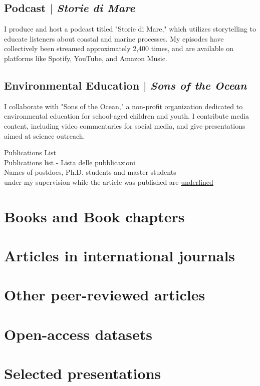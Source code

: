 \documentclass[11pt]{article}
\begin{document}
\subsection{Podcast $|$ {\normalfont\textit{Storie di Mare}}}
{\footnotesize I produce and host a podcast titled "Storie di Mare," which utilizes storytelling to educate listeners about coastal and marine processes. My episodes have collectively been streamed approximately 2,400 times, and are available on platforms like Spotify, YouTube, and Amazon Music.}
\bigskip

\subsection{Environmental Education $|$ {\normalfont\textit{Sons of the Ocean}}}
{\footnotesize I collaborate with "Sons of the Ocean," a non-profit organization dedicated to environmental education for school-aged children and youth. I contribute media content, including video commentaries for social media, and give presentations aimed at science outreach.}
\bigskip

\newpage
\begin{center}
    {\fontsize{36}{36}\selectfont\interheavy Publications \interthin List} \\ \bigskip
    {\fontsize{14}{14}\selectfont\interthin Publications list - Lista delle pubblicazioni}\\ \bigskip
        {\color{icnclr}} {Names of postdocs, Ph.D. students and master students \\ under my supervision while the article was published are \underline{underlined}}

\end{center}

\nocite{*}
\section{Books and Book chapters}
\printbibliography[type=book,heading=none]

\section{Articles in international journals}
\printbibliography[type=article,heading=none]

\section{Other peer-reviewed articles}
\printbibliography[type=periodical,heading=none]

\section{Open-access datasets}
\printbibliography[type=dataset,heading=none]

\section{Selected presentations}
\printbibliography[type=misc,heading=none]
\end{document}
